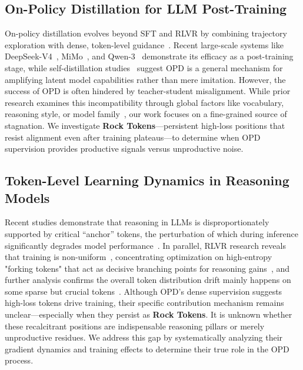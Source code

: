 \subsection{On-Policy Distillation for LLM Post-Training}

On-policy distillation evolves beyond SFT and RLVR by combining trajectory exploration with dense, token-level guidance~\cite{lu2025onpolicydistillation,fu2025pruningweightstruthsafeguarding}. Recent large-scale systems like DeepSeek-V4~\cite{deepseekv4}, MiMo~\cite{xiao2026mimo}, and Qwen-3~\cite{qwen3technicalreport} demonstrate its efficacy as a post-training stage, while self-distillation studies~\cite{zhao2026self,shenfeld2026self,hubotter2026reinforcement} suggest OPD is a general mechanism for amplifying latent model capabilities rather than mere imitation. However, the success of OPD is often hindered by teacher-student misalignment. While prior research examines this incompatibility through global factors like vocabulary, reasoning style, or model family~\cite{fu2026revisiting,li2026rethinking}, our work focuses on a fine-grained source of stagnation. We investigate \textbf{Rock Tokens}—persistent high-loss positions that resist alignment even after training plateaus—to determine when OPD supervision provides productive signals versus unproductive noise.



\subsection{Token-Level Learning Dynamics in Reasoning Models}

Recent studies demonstrate that reasoning in LLMs is disproportionately supported by critical ``anchor'' tokens, the perturbation of which during inference significantly degrades model performance~\cite{gupta2025llms}. In parallel, RLVR research reveals that training is non-uniform~\cite{yang2025token,cheng2026reasoning,wu2025mitigating}, concentrating optimization on high-entropy "forking tokens" that act as decisive branching points for reasoning gains~\cite{wangbeyond,li2025faedkvinfinitewindowfouriertransform}, and further analysis confirms the overall token distribution drift mainly happens on some sparse but crucial tokens~\cite{meng2026sparse}. Although OPD's dense supervision suggests high-loss tokens drive training, their specific contribution mechanism remains unclear—especially when they persist as \textbf{Rock Tokens}. It is unknown whether these recalcitrant positions are indispensable reasoning pillars or merely unproductive residues. We address this gap by systematically analyzing their gradient dynamics and training effects to determine their true role in the OPD process.